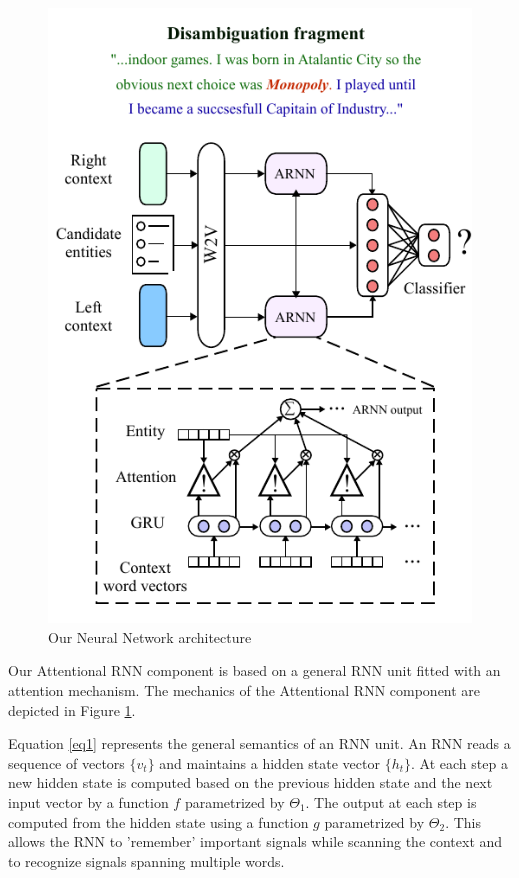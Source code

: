 \documentclass[11pt]{article}
\begin{document}
\begin{figure}
\centering
\includegraphics[scale=0.9]{diagrams/model_color_v3.pdf}
\caption{Our Neural Network architecture }
\label{fig:arnn}
\end{figure}	

Our Attentional RNN component is based on a general RNN unit fitted with an attention mechanism. The mechanics of the Attentional RNN component are depicted in Figure \ref{fig:arnn}. 
	
Equation \ref{eq1} represents the general semantics of an RNN unit. An RNN reads a sequence of vectors $\{v_t\}$ and maintains a hidden state vector $\{h_t\}$. At each step a new hidden state is computed based on the previous hidden state and the next input vector by a function $f$ parametrized by $\Theta_1$. The output at each step is computed from the hidden state using a function $g$ parametrized by $\Theta_2$. This allows the RNN to 'remember' important signals while scanning the context and to recognize signals spanning multiple words.
\end{document}

